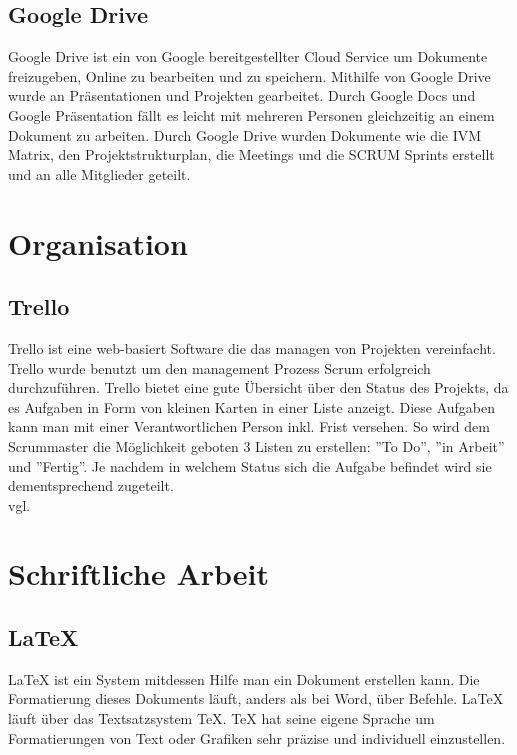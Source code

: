 \subsection {Google Drive}
\label{sec:GoogleDrive}
Google Drive ist ein von Google bereitgestellter Cloud Service um Dokumente freizugeben, Online zu bearbeiten und zu speichern.
Mithilfe von Google Drive wurde an Präsentationen und Projekten gearbeitet. Durch Google Docs und Google Präsentation fällt es leicht mit mehreren Personen gleichzeitig an einem Dokument zu arbeiten. Durch Google Drive wurden Dokumente wie die IVM Matrix, den Projektstrukturplan, die Meetings und die SCRUM Sprints erstellt und an alle Mitglieder geteilt. 
\section{Organisation}
\label{sec:Organisation}
\subsection {Trello}
\label{sec:Trello}
Trello ist eine web-basiert Software die das managen von Projekten vereinfacht. Trello wurde benutzt um den management Prozess Scrum erfolgreich durchzuführen. Trello bietet eine gute Übersicht über den Status des Projekts, da es Aufgaben in Form von kleinen Karten in einer Liste anzeigt. Diese Aufgaben kann man mit einer Verantwortlichen Person inkl. Frist versehen. So wird dem Scrummaster die Möglichkeit geboten 3 Listen zu erstellen: ''To Do'', ''in Arbeit'' und ''Fertig''. Je nachdem in welchem Status sich die Aufgabe befindet wird sie dementsprechend zugeteilt. \\vgl. \cite{trello} 
\section{Schriftliche Arbeit}
\label{sec:TechSchriftlicheArbeit}
\subsection {LaTeX}
\label{sec:LaTeX}
LaTeX ist ein System mitdessen Hilfe man ein Dokument erstellen kann. Die Formatierung dieses Dokuments läuft, anders als bei Word, über Befehle. LaTeX läuft über das Textsatzsystem TeX. TeX hat seine eigene Sprache um Formatierungen von Text oder Grafiken sehr präzise und individuell einzustellen. 
